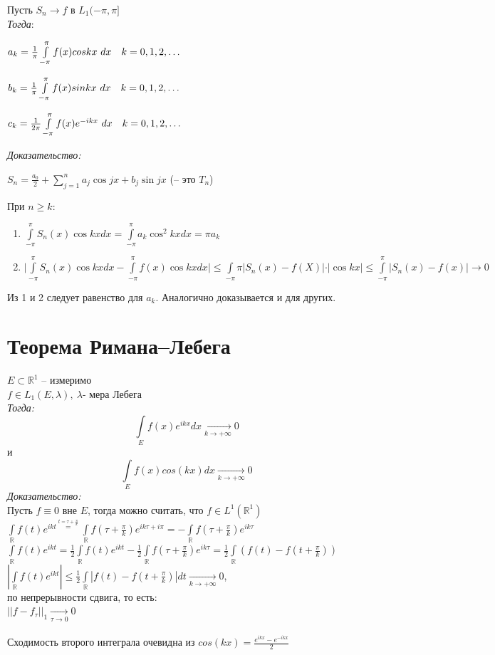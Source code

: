 \documentclass[paper=a4, fontsize=17pt]{article}
\begin{document}
Пусть $S_n \rightarrow f$ в $L_1(-\pi, \pi]$\\ 

\emph{Тогда}:

$a_k = \frac{1}{\pi}\int\limits_{-\pi}^{\pi}f(x)coskx\ dx \quad k = 0, 1, 2, \mathellipsis$

$b_k = \frac{1}{\pi}\int\limits_{-\pi}^{\pi}f(x)sinkx\ dx \quad k = 0, 1, 2, \mathellipsis$

$c_k = \frac{1}{2\pi}\int\limits_{-\pi}^{\pi}f(x)e^{-ikx}\ dx \quad k = 0, 1, 2, \mathellipsis$


\emph{Доказательство:}

$S_n=\frac{a_0}2 + \sum\limits_{j=1}^n a_j \cos jx + b_j \sin jx$ (-- это $T_n$)

При $n \ge k:$

\begin{enumerate}
	\item 
		$\int\limits_{-\pi}^{\pi} S_n(x) \cos kx dx = \int\limits_{-\pi}^{\pi} a_k \cos^2 kx dx = \pi a_k$ 

	\item
		$\vert \int\limits_{-\pi}^{\pi} S_n(x) \cos kx dx - \int\limits_{-\pi}^{\pi} f(x) \cos kx dx \vert \le \int\limits_{-\pi}{\pi} \vert S_n(x)-f(X) \vert \cdot \vert \cos kx \vert \le \int\limits_{-\pi}^{\pi} \vert S_n(x) - f(x) \vert \rightarrow 0$
\end{enumerate}

Из 1 и 2 следует равенство для $a_k$. Аналогично доказывается и для других.

\section{Теорема Римана--Лебега}
$E \subset \mathds{R}^1$ -- измеримо\\ $f \in L_1(E, \lambda), ~ \lambda \text{- мера Лебега}$ \\
\emph{Тогда:} $$\int\limits_{E}f(x)e^{ikx}dx \xrightarrow[k \to +\infty]{} 0$$ и $$\int\limits_{E}f(x)cos(kx)dx \xrightarrow[k \to +\infty]{} 0$$
\emph{Доказательство:} \\
Пусть $f \equiv 0$ вне $E$, тогда можно считать, что $f \in L^1(\mathds{R}^1)$ \\
$\int\limits_{\mathds{R}}f(t)e^{ikt \overset{t=\tau + \frac{\pi}{k}}{=}} \int\limits_{\mathds{R}}f(\tau + \frac{\pi}{k})e^{i k \tau + i\pi} = -\int\limits_{\mathds{R}}f(\tau + \frac{\pi}{k})e^{ik\tau}$ \\
$\int\limits_{\mathds{R}}f(t)e^{ikt} = \frac{1}{2}\int\limits_{\mathds{R}}f(t)e^{ikt} - \frac{1}{2}\int\limits_{\mathds{R}}f(\tau + \frac{\pi}{k})e^{ik\tau} = \frac{1}{2}\int\limits_{\mathds{R}}(f(t) - f(t + \frac{\pi}{k}))$ \\
$|\int\limits_{\mathds{R}}f(t)e^{ikt}| \leq\frac{1}{2}\int\limits_{\mathds{R}}|f(t) - f(t + \frac{\pi}{k})|dt \xrightarrow[k \to +\infty]{}0$,\\по непрерывности сдвига, то есть:\\$||f-f_{\tau}||_1 \xrightarrow[\tau\to 0]{}0$
\\\\
Сходимость второго интеграла очевидна из $cos(kx) = \frac{e^{ikx} - e^{-ikx}}{2}$
\end{document}
